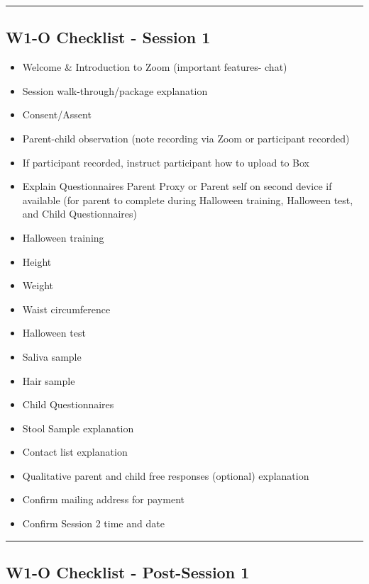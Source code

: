 \documentclass[
]{book}
\providecommand{\tightlist}{%
  \setlength{\itemsep}{0pt}\setlength{\parskip}{0pt}}
\begin{document}
\begin{center}\rule{0.5\linewidth}{0.5pt}\end{center}

\hypertarget{w1-o-checklist---session-1}{%
\subsection{W1-O Checklist - Session 1}\label{w1-o-checklist---session-1}}

\begin{itemize}
\tightlist
\item
  Welcome \& Introduction to Zoom (important features- chat)
\item
  Session walk-through/package explanation
\item
  Consent/Assent
\item
  Parent-child observation (note recording via Zoom or participant recorded)
\item
  If participant recorded, instruct participant how to upload to Box
\item
  Explain Questionnaires Parent Proxy or Parent self on second device if available (for parent to complete during Halloween training, Halloween test, and Child Questionnaires)
\item
  Halloween training
\item
  Height
\item
  Weight
\item
  Waist circumference
\item
  Halloween test
\item
  Saliva sample
\item
  Hair sample
\item
  Child Questionnaires
\item
  Stool Sample explanation
\item
  Contact list explanation
\item
  Qualitative parent and child free responses (optional) explanation
\item
  Confirm mailing address for payment
\item
  Confirm Session 2 time and date
\end{itemize}

\begin{center}\rule{0.5\linewidth}{0.5pt}\end{center}

\hypertarget{w1-o-checklist---post-session-1}{%
\subsection{W1-O Checklist - Post-Session 1}\label{w1-o-checklist---post-session-1}}
\end{document}
